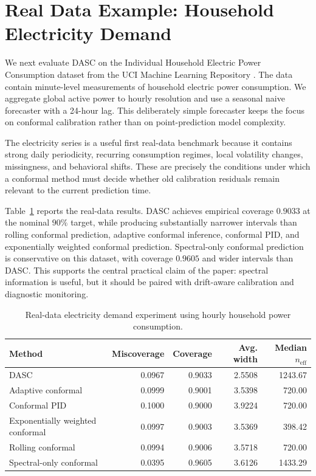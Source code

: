 \documentclass[11pt]{article}
\begin{document}
\section{Real Data Example: Household Electricity Demand}

We next evaluate DASC on the Individual Household Electric Power Consumption dataset from the UCI Machine Learning Repository \citep{uci_household_power}. The data contain minute-level measurements of household electric power consumption. We aggregate global active power to hourly resolution and use a seasonal naive forecaster with a 24-hour lag. This deliberately simple forecaster keeps the focus on conformal calibration rather than on point-prediction model complexity.

The electricity series is a useful first real-data benchmark because it contains strong daily periodicity, recurring consumption regimes, local volatility changes, missingness, and behavioral shifts. These are precisely the conditions under which a conformal method must decide whether old calibration residuals remain relevant to the current prediction time.

Table~\ref{tab:real-electricity} reports the real-data results. DASC achieves empirical coverage $0.9033$ at the nominal $90\%$ target, while producing substantially narrower intervals than rolling conformal prediction, adaptive conformal inference, conformal PID, and exponentially weighted conformal prediction. Spectral-only conformal prediction is conservative on this dataset, with coverage $0.9605$ and wider intervals than DASC. This supports the central practical claim of the paper: spectral information is useful, but it should be paired with drift-aware calibration and diagnostic monitoring.

\begin{table}[t]
\centering
\caption{Real-data electricity demand experiment using hourly household power consumption.}
\label{tab:real-electricity}
\begin{tabular}{lrrrr}
\toprule
Method & Miscoverage & Coverage & Avg. width & Median $n_{\mathrm{eff}}$ \\
\midrule
DASC & 0.0967 & 0.9033 & 2.5508 & 1243.67 \\
Adaptive conformal & 0.0999 & 0.9001 & 3.5398 & 720.00 \\
Conformal PID & 0.1000 & 0.9000 & 3.9224 & 720.00 \\
Exponentially weighted conformal & 0.0997 & 0.9003 & 3.5369 & 398.42 \\
Rolling conformal & 0.0994 & 0.9006 & 3.5718 & 720.00 \\
Spectral-only conformal & 0.0395 & 0.9605 & 3.6126 & 1433.29 \\
\bottomrule
\end{tabular}
\end{table}
\end{document}
